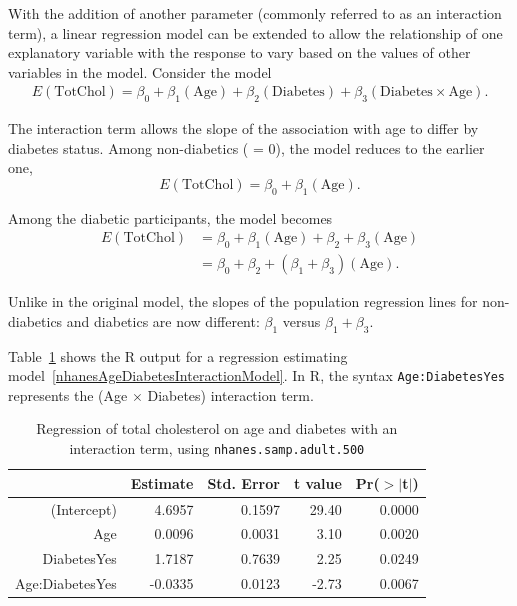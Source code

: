 With the addition of another parameter (commonly referred to as an interaction term), a linear regression model can be extended to allow the relationship of one explanatory variable with the response to vary based on the values of other variables in the model. Consider the model
\begin{align}\label{nhanesAgeDiabetesInteractionModel}
E(\text{TotChol}) = \beta_0 + \beta_1(\text{Age}) + \beta_2(\text{Diabetes}) + 
\beta_3 (\text{Diabetes} \times \text{Age}). 
\end{align}

The interaction term allows the slope of the association with age to differ by diabetes status. Among non-diabetics ( = 0), the model reduces to the earlier one,
\[E(\text{TotChol}) = \beta_0 + \beta_1(\text{Age}). \]

Among the diabetic participants, the model becomes
\begin{align*}
  E(\text{TotChol}) &= \beta_0  + \beta_1(\text{Age}) + \beta_2 + 
       \beta_3 (\text{Age}) \\
       & = \beta_0 + \beta_2 + (\beta_1 + \beta_3)(\text{Age}).
\end{align*}

Unlike in the original model, the slopes of the population regression lines for non-diabetics and diabetics are now different: $\beta_1$ versus $\beta_1 + \beta_3$.

Table~\ref{nhanesAgeDiabetesInteraction} shows the \textsf{R} output for a regression estimating model~\ref{nhanesAgeDiabetesInteractionModel}. In \textsf{R}, the syntax \texttt{Age:DiabetesYes} represents the (Age $\times$ Diabetes) interaction term. 

\begin{table}[ht]
\centering
\begin{tabular}{rrrrr}
  \hline
 & Estimate & Std. Error & t value & Pr($>$$|$t$|$) \\ 
  \hline
(Intercept) & 4.6957 & 0.1597 & 29.40 & 0.0000 \\ 
  Age & 0.0096 & 0.0031 & 3.10 & 0.0020 \\ 
  DiabetesYes & 1.7187 & 0.7639 & 2.25 & 0.0249 \\ 
  Age:DiabetesYes & -0.0335 & 0.0123 & -2.73 & 0.0067 \\ 
   \hline
\end{tabular}
\caption{Regression of total cholesterol on age and diabetes with an interaction term, using \texttt{nhanes.samp.adult.500}} 
\label{nhanesAgeDiabetesInteraction}
\end{table}

